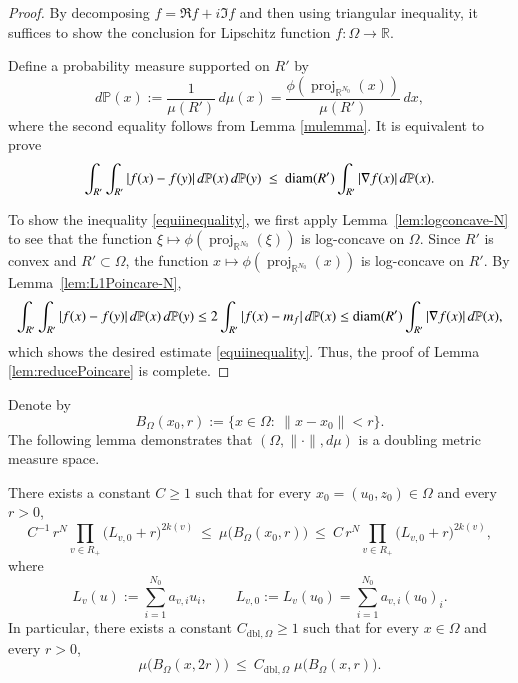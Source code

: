 \documentclass[12pt]{amsart}
\begin{document}
\begin{proof}
By decomposing $f=\Re f+i\Im f$ and then using triangular inequality, it suffices to show the conclusion for Lipschitz function $f:\Omega\to\mathbb{R}$.

Define a probability measure supported on $R'$ by
\[
d\mathbb{P}(x):=\frac{1}{\mu(R')}\,d\mu(x)
=\frac{\phi(\operatorname{proj}_{\mathbb R^{N_0}}(x))}{\mu(R')}\,dx,
\]
where the second equality follows from Lemma \ref{mulemma}.
It is equivalent to prove
\begin{align}\label{equiinequality}
\int_{R'}\int_{R'} |f(x)-f(y)|\,d\mathbb{P}(x)\,d\mathbb{P}(y)
\ \le\ {\rm diam}(R')\int_{R'}|\nabla f(x)|\,d\mathbb{P}(x).
\end{align}


To show the inequality \eqref{equiinequality}, we first apply Lemma~\ref{lem:logconcave-N} to see that the function $\xi\mapsto \phi(\operatorname{proj}_{\mathbb R^{N_0}}(\xi))$ is log-concave on $\Omega$.
Since $R'$ is convex and $R'\subset\Omega$, the function
$
x\mapsto \phi(\operatorname{proj}_{\mathbb R^{N_0}}(x))$
is log-concave on $R'$.
By Lemma~\ref{lem:L1Poincare-N},
\[
\int_{R'}\int_{R'} |f(x)-f(y)|\,d\mathbb{P}(x)\,d\mathbb{P}(y)
\le 2\int_{R'} |f(x)-m_f|\,d\mathbb{P}(x)\leq {\rm diam}(R')\int_{R'}|\nabla f(x)|\,d\mathbb{P}(x),
\]
which shows the desired estimate \eqref{equiinequality}. Thus, the proof of Lemma \ref{lem:reducePoincare} is complete.
\end{proof}

Denote by
$$B_\Omega(x_0,r):=\{x\in\Omega:\ \|x-x_0\|<r\}.$$
The following lemma demonstrates that $(\Omega,\|\cdot\|,d\mu)$ is a doubling metric measure space.
\begin{lemma}\label{lem:ball-2sided-N}
There exists a constant $C\ge 1$ such that
for every $x_0=(u_0,z_0)\in\Omega$ and every $r>0$,
\begin{equation}\label{eq:ball-2sided-Omega}
C^{-1}\,r^N\prod_{v\in R_+}\Big(L_{v,0}+r\Big)^{2k(v)}
\ \le\
\mu\big(B_\Omega(x_0,r)\big)
\ \le\
C\,r^N\prod_{v\in R_+}\Big(L_{v,0}+r\Big)^{2k(v)},
\end{equation}
where
\[
L_v(u):=\sum_{i=1}^{N_{0}} a_{v,i}u_i,
\qquad
L_{v,0}:=L_v(u_0)=\sum_{i=1}^{N_{0}} a_{v,i}(u_0)_i.
\]
In particular, there exists a constant $C_{\mathrm{dbl},\Omega}\geq 1$ such that for every $x\in\Omega$ and every $r>0$,
\[
\mu\big(B_\Omega(x,2r)\big)\ \le\ C_{\mathrm{dbl},\Omega}\;\mu\big(B_\Omega(x,r)\big).
\]
\end{lemma}
\end{document}
